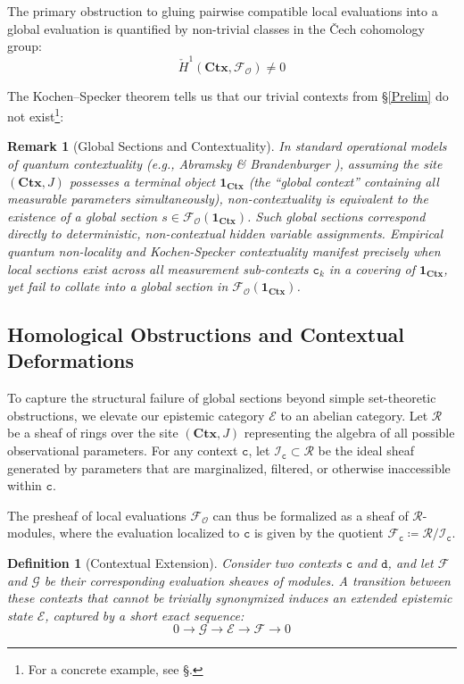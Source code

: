 \documentclass{article}
\newtheorem{dn}{Definition}
\newtheorem{rk}{Remark}
\numberwithin{tm}{section}
\numberwithin{dn}{section}
\numberwithin{as}{section}
\numberwithin{rk}{section}
\numberwithin{lem}{section}
\numberwithin{ax}{section}
\numberwithin{pp}{section}
\numberwithin{eg}{section}
\numberwithin{war}{section}
\numberwithin{equation}{section}
\numberwithin{prop}{section}
\numberwithin{nt}{section}
\numberwithin{rc}{section}
\def\code#1{\texttt{#1}}
\begin{document}
The primary obstruction to gluing pairwise compatible local evaluations into a global evaluation is quantified by non-trivial classes in the Čech cohomology group:
\[
\check{H}^1(\mathbf{Ctx}, \mathcal{F}_\mathcal{O}) \neq 0
\]

The Kochen--Specker theorem tells us that our trivial contexts from \S\ref{Prelim} do not exist\footnote{For a concrete example, see \S{}.}: 

\begin{rk}[Global Sections and Contextuality]
	In standard operational models of quantum contextuality (e.g., Abramsky \& Brandenburger \cite{abramsky}), assuming the site $(\mathbf{Ctx}, J)$ possesses a terminal object $\mathbf{1}_{\mathbf{Ctx}}$ (the ``global context'' containing all measurable parameters simultaneously), non-contextuality is equivalent to the existence of a global section $s \in \mathcal{F}_\mathcal{O}(\mathbf{1}_{\mathbf{Ctx}})$. Such global sections correspond directly to deterministic, non-contextual hidden variable assignments. Empirical quantum non-locality and Kochen-Specker contextuality manifest precisely when local sections exist across all measurement sub-contexts $\code{c}_k$ in a covering of $\mathbf{1}_{\mathbf{Ctx}}$, yet fail to collate into a global section in $\mathcal{F}_\mathcal{O}(\mathbf{1}_{\mathbf{Ctx}})$.
\end{rk}

\subsection{Homological Obstructions and Contextual Deformations}

To capture the structural failure of global sections beyond simple set-theoretic obstructions, we elevate our epistemic category $\mathcal{E}$ to an abelian category. Let $\mathcal{R}$ be a sheaf of rings over the site $(\mathbf{Ctx}, J)$ representing the algebra of all possible observational parameters. For any context $\code{c}$, let $\mathcal{I}_\code{c} \subset \mathcal{R}$ be the ideal sheaf generated by parameters that are marginalized, filtered, or otherwise inaccessible within $\code{c}$.

The presheaf of local evaluations $\mathcal{F}_\mathcal{O}$ can thus be formalized as a sheaf of $\mathcal{R}$-modules, where the evaluation localized to $\code{c}$ is given by the quotient $\mathcal{F}_\code{c} \coloneq \mathcal{R} / \mathcal{I}_\code{c}$.

\begin{dn}[Contextual Extension] 
	Consider two contexts $\code{c}$ and $\code{d}$, and let $\mathcal{F}$ and $\mathcal{G}$ be their corresponding evaluation sheaves of modules. A transition between these contexts that cannot be trivially synonymized induces an extended epistemic state $\mathcal{E}$, captured by a short exact sequence:
	\begin{equation}
		0 \longrightarrow \mathcal{G} \longrightarrow \mathcal{E} \longrightarrow \mathcal{F} \longrightarrow 0
	\end{equation}
\end{dn}
\end{document}
